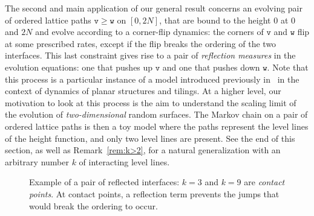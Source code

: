 \documentclass[AHL,Unicode,longabstracts]{cedram}
\theoremstyle{plain}
\newcommand{\ttv}{\mathtt{v}}
\newcommand{\ttw}{\mathtt{w}}
\begin{document}
The second and main application of our general result concerns an evolving pair of ordered lattice paths $\ttv \ge \ttw$ on $[0,2N]$, that are bound to the height $0$ at $0$ and $2N$ and evolve according to a corner-flip dynamics: the corners of $\ttv$ and $\ttw$ flip at some prescribed rates, except if the flip breaks the ordering of the two interfaces. This last constraint gives rise to a pair of
\emph{reflection measures} in the evolution equations: one that pushes up $\ttv$ and one that pushes down $\ttw$. Note that this process is a particular instance of a model introduced previously in~\cite{luby2001markov,wilson2004mixing} in the context of dynamics of planar structures and tilings. At a higher level, our motivation to look at this process is the aim to understand the scaling limit of the evolution of \emph{two-dimensional} random surfaces. The Markov chain on a pair of ordered lattice paths is then a toy model where the paths represent the level lines of the height function, and only two level lines are present. See the end of this section, as well as Remark~\ref{rem:k>2}, for a natural generalization with an arbitrary number $k$ of interacting level lines.

\begin{figure}[!htbp]
\centering
{}
\caption{Example of a pair of reflected interfaces: $k=3$ and $k=9$ are \emph{contact points}. At contact points, a reflection term prevents the jumps that would break the ordering to occur.}
\label{fig1.1}
\end{figure}
\end{document}
